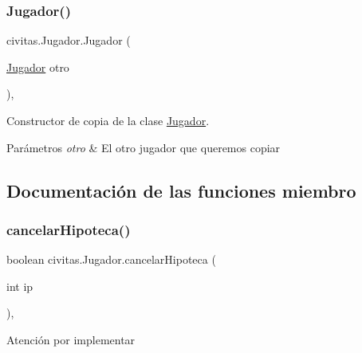 \subsubsection{\texorpdfstring{Jugador()}{Jugador()}\hspace{0.1cm}{\footnotesize\ttfamily [2/2]}}
{\footnotesize\ttfamily civitas.\+Jugador.\+Jugador (\begin{DoxyParamCaption}\item[{\hyperlink{classcivitas_1_1Jugador}{Jugador}}]{otro }\end{DoxyParamCaption})\hspace{0.3cm}{\ttfamily [inline]}, {\ttfamily [protected]}}

Constructor de copia de la clase \hyperlink{classcivitas_1_1Jugador}{Jugador}. 
\begin{DoxyParams}{Parámetros}
{\em otro} & El otro jugador que queremos copiar \\
\hline
\end{DoxyParams}


\subsection{Documentación de las funciones miembro}
\mbox{\label{classcivitas_1_1Jugador_a3258e1efe659b753aae45e38d6d7a6e2}} 
\subsubsection{\texorpdfstring{cancelar\+Hipoteca()}{cancelarHipoteca()}}
{\footnotesize\ttfamily boolean civitas.\+Jugador.\+cancelar\+Hipoteca (\begin{DoxyParamCaption}\item[{int}]{ip }\end{DoxyParamCaption})\hspace{0.3cm}{\ttfamily [inline]}, {\ttfamily [package]}}

\begin{DoxyWarning}{Atención}
por implementar 
\end{DoxyWarning}
\mbox{\label{classcivitas_1_1Jugador_af26359708ca0a967152c3e38ef0e0c6b}} 
